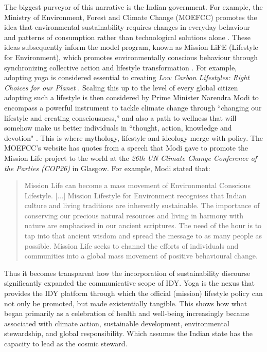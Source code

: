 \documentclass[11pt]{article}
\begin{document}
The biggest purveyor of this narrative is the Indian government. For example, the Ministry of Environment, Forest and Climate Change (MOEFCC) promotes the idea  that environmental sustainability requires changes in everyday behaviour and patterns of consumption rather than technological solutions alone \cite{moefcc2016}. These ideas subsequently inform the model program, known as Mission LiFE (Lifestyle for Environment), which promotes environmentally conscious behaviour through synchronizing collective action and lifestyle transformation \cite{moefcc2026}. For example, adopting yoga is considered essential to creating \textit{Low Carbon Lifestyles: Right Choices for our Planet} \cite{moefcc2016}. Scaling this up to the level of every global citizen adopting such a lifestyle is then considered by Prime Minister Narendra Modi to encompass a powerful instrument to tackle climate change through “changing our lifestyle and creating consciousness,” and also a path to wellness that will somehow make us better individuals in “thought, action, knowledge and devotion" \cite{indiandiplomacy2017,un2016a,un2016b,un2019}. This is where mythology, lifestyle and ideology merge with policy. The MOEFCC's website has quotes from a speech that Modi gave to promote the Mission Life project to the world at the \textit{26th UN Climate Change Conference of the Parties (COP26)} in Glasgow. For example, Modi stated that:

\begin{quote}
Mission Life can become a mass movement of Environmental Conscious Lifestyle. [...] Mission Lifestyle for Environment recognises that Indian culture and living traditions are inherently sustainable. The importance of conserving our precious natural resources and living in harmony with nature are emphasised in our ancient scriptures. The need of the hour is to tap into that ancient wisdom and spread the message to as many people as possible. Mission Life seeks to channel the efforts of individuals and communities into a global mass movement of positive behavioural change. 
 \cite{moefcc2026}
\end{quote}

Thus it becomes transparent how the incorporation of sustainability discourse significantly expanded the communicative scope of IDY. Yoga is the nexus that provides the IDY platform through which the official (mission) lifestyle policy can not only be promoted, but made existentially tangible. This shows how what began primarily as a celebration of health and well-being increasingly became associated with climate action, sustainable development, environmental stewardship, and global responsibility. Which assumes the Indian state has the capacity to lead as the cosmic steward.
\end{document}
